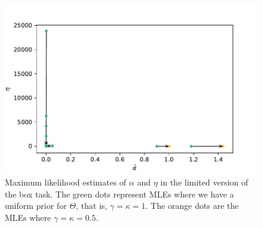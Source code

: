 \begin{figure}
    \centering
    \includegraphics[scale=0.7]{pictures/Sensitivity/mles_lim_a_e.pdf}
    \caption[MLEs of $\alpha$ and $\eta$ for prior with $\gamma=\kappa=1$ and $\gamma=\kappa=0.5$, limited]{
    Maximum likelihood estimates of $\alpha$ and $\eta$ in the limited version of the box task. The green dots represent MLEs where we have a uniform prior for $\Theta$, that is, $\gamma=\kappa=1$. The orange dots are the MLEs where $\gamma=\kappa=0.5$.}
    \label{fig:sensitivity_mles_lim_a_e}
\end{figure}


